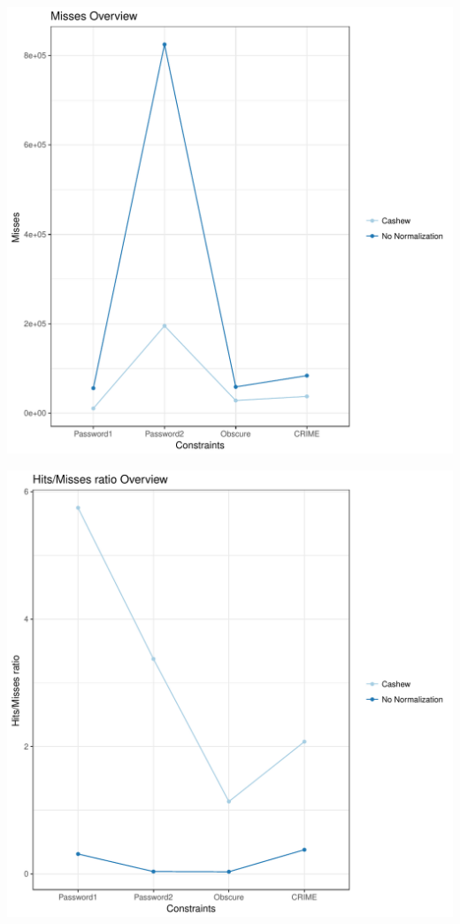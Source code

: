 \documentclass{article}\usepackage[]{graphicx}\usepackage[]{color}
\makeatletter
\def\maxwidth{ %
  \ifdim\Gin@nat@width>\linewidth
    \linewidth
  \else
    \Gin@nat@width
  \fi
}
\newenvironment{knitrout}{}{} %
\makeatother
\begin{document}
\begin{knitrout}
\color{fgcolor}
\includegraphics[width=\maxwidth]{figure/overview_misses-1} 

\end{knitrout}
\begin{knitrout}
\color{fgcolor}
\includegraphics[width=\maxwidth]{figure/overview_hitsMissesRatio-1} 

\end{knitrout}
\end{document}
